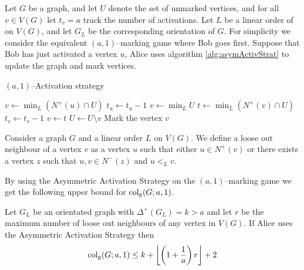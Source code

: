 \begin{definition} 
    Let $G$ be a graph, and let $U$ denote the set of unmarked vertices, and for all $v\in V(G)$ let $t_v=a$ track the number of activations. Let $L$ be a linear order of on $V(G)$, and let $G_L$ be the corresponding orientation of $G$. %
    For simplicity we consider the equivalent $(a,1)$--marking game where Bob goes first. Suppose that Bob has just activated a vertex $u$, Alice uses algorithm \ref{alg:asymActivStrat} to update the graph and mark vertices.
    
    \begin{algorithm}[h]
        \caption{$(a,1)$--Activation strategy}
        \label{alg:asymActivStrat}
        \begin{algorithmic}[1]
            \Statex
                    \State $v\gets \min_L (N^+(u)\cap U)$ %
                    \State $t_u \gets t_u-1$
                    \Else 
                    \State $v\gets \min_L U$                  
                \EndIf
                    \State $t\gets \min_L (N^+(v)\cap U)$ %
                    \State $t_v \gets t_v-1$
                    \State $v\gets t$
                \EndWhile
                \State $U \gets U \setminus v$
                \State Mark the vertex $v$
            \EndFor
        \end{algorithmic}
    \end{algorithm}
    
    Consider a graph $G$ and a linear order $L$ on $V(G)$. We define a loose out neighbour of a vertex $v$ as a vertex $u$ such that either $u\in N^+(v)$ or there exists a vertex $z$ such that $u,v\in N^-(z)$ and $u<_L v$. 
    
    By using the Asymmetric Activation Strategy on the $(a,1)$--marking game we get the following upper bound for $\operatorname{col_g}(G;a,1)$.

    \begin{theorem}  %
        Let $G_L$ be an orientated graph with $\Delta^+(G_L)=k>a$ and let $r$ be the maximum number of loose out neighbours of any vertex in $V(G)$. If Alice uses the Asymmetric Activation Strategy then \[\operatorname{col_g}(G;a,1)\leq k+\left\lfloor \left(1+\frac{1}{a}\right)r \right\rfloor +2\]
    \end{theorem}

    
    

\end{definition}



